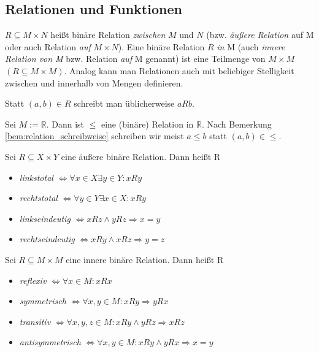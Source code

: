 \documentclass[10pt]{scrbook}
\begin{document}
\subsection{Relationen und Funktionen}
\begin{Def} $R\subseteq M\times N$ heißt binäre Relation \emph{zwischen} $M$ und $N$ (bzw. \emph{äußere Relation} auf M oder auch Relation \emph{auf} $ M\times N$). Eine binäre Relation $R$ \emph{in} M (auch \emph{innere Relation von M} bzw. Relation \emph{auf} M genannt) ist eine Teilmenge von $M\times M$ $(R\subseteq M\times M)$. Analog kann man Relationen auch mit beliebiger Stelligkeit zwischen und innerhalb von Mengen definieren.\end{Def}

\begin{Bem}\label{bem:relation_schreibweise} Statt $(a, b)\in R$ schreibt man üblicherweise $a R b$.\end{Bem}

\begin{Bsp}Sei $M:=\mathbb{R}$. Dann ist $\leq$ eine (binäre) Relation in $\mathbb{R}$. Nach Bemerkung \ref{bem:relation_schreibweise} schreiben wir meist $a\leq b$ statt $(a, b)\in \leq$.\end{Bsp}

\begin{Def}Sei $R\subseteq X\times Y$ eine äußere binäre Relation. Dann heißt R
\begin{itemize}
	\item \emph{linkstotal} $\Leftrightarrow\forall x\in X\exists y\in Y: x R y$
	\item \emph{rechtstotal} $\Leftrightarrow\forall y\in Y\exists x\in X: x R y$
	\item \emph{linkseindeutig} $\Leftrightarrow x R z \wedge y R z \Rightarrow x=y$
	\item \emph{rechtseindeutig} $\Leftrightarrow x R y \wedge x R z \Rightarrow y=z$
\end{itemize}
\end{Def}

\begin{Def}Sei $R\subseteq M\times M$ eine innere binäre Relation. Dann heißt R
\begin{itemize}
	\item \emph{reflexiv} $\Leftrightarrow\forall x\in M: x R x$
	\item \emph{symmetrisch} $\Leftrightarrow\forall x, y\in M: x R y \Rightarrow y R x$
	\item \emph{transitiv} $\Leftrightarrow\forall x, y, z\in M: x R y \wedge y R z \Rightarrow x R z$
	\item \emph{antisymmetrisch} $\Leftrightarrow\forall x, y\in M: x R y \wedge y R x \Rightarrow x=y$
\end{itemize}
\end{Def}
\end{document}
